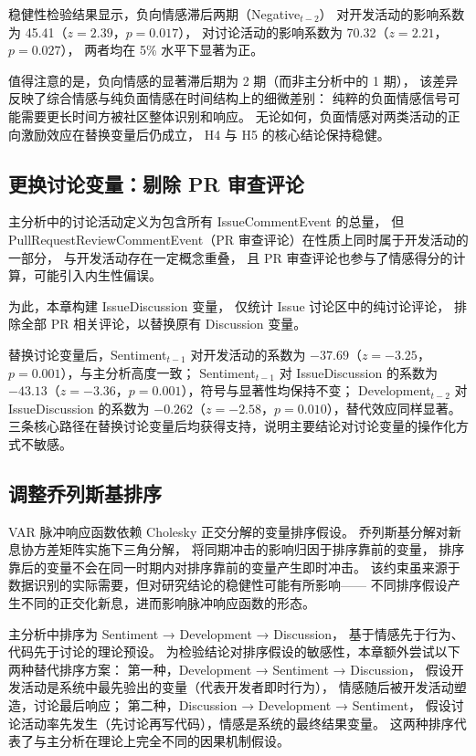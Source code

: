 稳健性检验结果显示，负向情感滞后两期（Negative$_{t-2}$）
对开发活动的影响系数为 45.41（$z = 2.39$，$p = 0.017$），
对讨论活动的影响系数为 70.32（$z = 2.21$，$p = 0.027$），
两者均在 5\% 水平下显著为正。

值得注意的是，负向情感的显著滞后期为 2 期（而非主分析中的 1 期），
该差异反映了综合情感与纯负面情感在时间结构上的细微差别：
纯粹的负面情感信号可能需要更长时间方被社区整体识别和响应。
无论如何，负面情感对两类活动的正向激励效应在替换变量后仍成立，
H4 与 H5 的核心结论保持稳健。

\subsection{更换讨论变量：剔除 PR 审查评论}

主分析中的讨论活动定义为包含所有 IssueCommentEvent 的总量，
但 PullRequestReviewCommentEvent（PR 审查评论）在性质上同时属于开发活动的一部分，
与开发活动存在一定概念重叠，
且 PR 审查评论也参与了情感得分的计算，可能引入内生性偏误。

为此，本章构建 IssueDiscussion 变量，
仅统计 Issue 讨论区中的纯讨论评论，
排除全部 PR 相关评论，以替换原有 Discussion 变量。

替换讨论变量后，Sentiment$_{t-1}$ 对开发活动的系数为
$-37.69$（$z = -3.25$，$p = 0.001$），与主分析高度一致；
Sentiment$_{t-1}$ 对 IssueDiscussion 的系数为
$-43.13$（$z = -3.36$，$p = 0.001$），符号与显著性均保持不变；
Development$_{t-2}$ 对 IssueDiscussion 的系数为
$-0.262$（$z = -2.58$，$p = 0.010$），替代效应同样显著。
三条核心路径在替换讨论变量后均获得支持，说明主要结论对讨论变量的操作化方式不敏感。

\subsection{调整乔列斯基排序}

VAR 脉冲响应函数依赖 Cholesky 正交分解的变量排序假设。
乔列斯基分解对新息协方差矩阵实施下三角分解，
将同期冲击的影响归因于排序靠前的变量，
排序靠后的变量不会在同一时期内对排序靠前的变量产生即时冲击。
该约束虽来源于数据识别的实际需要，但对研究结论的稳健性可能有所影响——
不同排序假设产生不同的正交化新息，进而影响脉冲响应函数的形态。

主分析中排序为 Sentiment → Development → Discussion，
基于情感先于行为、代码先于讨论的理论预设。
为检验结论对排序假设的敏感性，本章额外尝试以下两种替代排序方案：
第一种，Development → Sentiment → Discussion，
假设开发活动是系统中最先验出的变量（代表开发者即时行为），
情感随后被开发活动塑造，讨论最后响应；
第二种，Discussion → Development → Sentiment，
假设讨论活动率先发生（先讨论再写代码），情感是系统的最终结果变量。
这两种排序代表了与主分析在理论上完全不同的因果机制假设。

